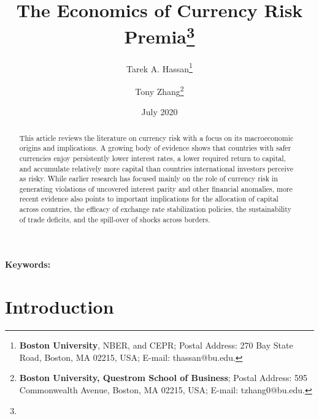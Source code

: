 \documentclass[12pt,letter]{article}
\theoremstyle{break} \theorembodyfont{\normalfont\itshape}
\theoremstyle{break}
\theoremstyle{break} \theorembodyfont{\normalfont\itshape}
\theoremstyle{break} \theorembodyfont{\normalfont\itshape}
\begin{document}
\author{Tarek A. Hassan\thanks{\textbf{Boston University}, NBER, and
    CEPR; Postal Address: 270 Bay State Road, Boston, MA 02215, USA;
    E-mail: thassan@bu.edu.} \and
  Tony Zhang\thanks{\textbf{%
      Boston University, Questrom School of Business}; Postal Address:
    595 Commonwealth Avenue, Boston, MA 02215, USA; E-mail:
    tzhang0@bu.edu.} }

\title{The Economics of Currency Risk Premia\thanks{}}

\date{ \bigskip July 2020}

\maketitle


\thispagestyle{empty}


\vspace{-0.7cm}





\begin{abstract}
  This article reviews the literature on currency risk with a focus on
  its macroeconomic origins and implications. A growing body of
  evidence shows that countries with safer currencies enjoy
  persistently lower interest rates, a lower required return to
  capital, and accumulate relatively more capital than countries
  international investors perceive as risky. While earlier research
  has focused mainly on the role of currency risk in generating
  violations of uncovered interest parity and other financial
  anomalies, more recent evidence also points to important
  implications for the allocation of capital across countries, the
  efficacy of exchange rate stabilization policies, the sustainability
  of trade deficits, and the spill-over of shocks across borders.
\end{abstract}


\bigskip


{\noindent \textbf{Keywords:} }

\pagebreak

 \setcounter{page}{1}


\section{Introduction}
\end{document}
